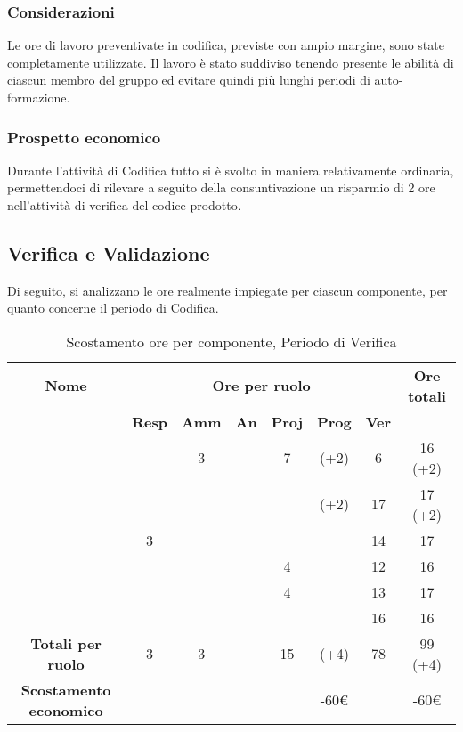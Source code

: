 \subsubsection{Considerazioni}
Le ore di lavoro preventivate in codifica, previste con ampio margine, sono state completamente utilizzate. Il lavoro è stato suddiviso tenendo presente le abilità di ciascun membro del gruppo ed evitare quindi più lunghi periodi di auto-formazione.

\subsubsection{Prospetto economico}
Durante l'attività di Codifica tutto si è svolto in maniera relativamente ordinaria, permettendoci di rilevare a seguito della consuntivazione un risparmio di 2 ore nell'attività di verifica del codice prodotto. 

\newpage
\subsection{Verifica e Validazione}

Di seguito, si analizzano le ore realmente impiegate per ciascun componente, per quanto concerne il periodo di Codifica.

\begin{table}[H]
	\begin{center}
		\begin{tabular}{|c|c|c|c|c|c|c|c|}
			\hline
			\textbf{Nome} & \multicolumn{6}{c|}{\textbf{Ore per ruolo}} & \textbf{Ore totali} \\\cline{2-7}
			& \textbf{Resp} & \textbf{Amm} & \textbf{An} & \textbf{Proj} & \textbf{Prog} & \textbf{Ver} & \\
			\hline
			\MC			&		&	3	&		&	7	&	(+2)	&	6	&	16 (+2)	\\
			\hline
			\AN			&		&		&		&	 	&	(+2)	&	17	& 	17	(+2)\\
			\hline
			\DAN		&	3	&		&		&		&		&	14	&	17	\\
			\hline
			\AS			&		&	 	&	 	&	4	&	 	& 	12	&	16	\\
			\hline
			\NS 		&		&		&		&	4	&		& 	13	&	17	\\
			\hline
			\DS			& 		&		&		&		&		&	16	&	16	\\
			\hline
			\textbf{Totali per ruolo}	& 	3	&	3	&		&  15	&	(+4)	&	78	&	99 (+4)	\\
			\hline
			\textbf{Scostamento economico}	& 		&		&		&		&	-60€	&		&	-60€	\\
			\hline
		\end{tabular}
	\end{center}
	\caption{Scostamento ore per componente, Periodo di Verifica}
\end{table}

